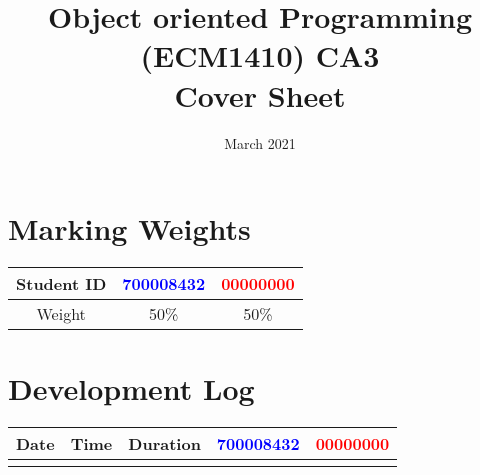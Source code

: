 \documentclass{article}
\title{%
  Object oriented Programming (ECM1410) CA3 \\
  \large Cover Sheet}
\date{March 2021}
\begin{document}
\maketitle

\section{Marking Weights}
\begin{center}
\begin{tabular}{ |c|c|c| } 
 \hline
 Student ID & \textcolor{blue}{700008432} & \textcolor{red}{00000000} \\
 \hline
 Weight & 50\% & 50\% \\
 \hline
\end{tabular}
\end{center}

\section{Development Log}
\begin{tabular}{ |c|c|c|c|c| } 
 \hline
 Date & Time & Duration & \textcolor{blue}{700008432} & \textcolor{red}{00000000} \\
 \hline
 &&&&
\end{tabular}
\end{document}
